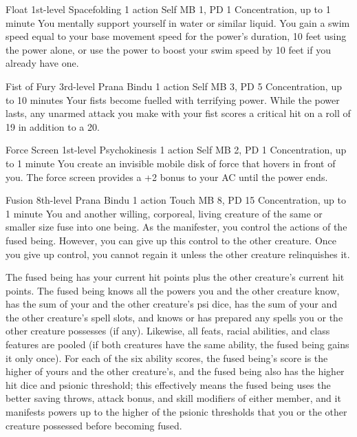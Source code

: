 \DndPowerHeader%
  {Float}
  {1st-level Spacefolding}
  {1 action}
  {Self}
  {MB 1, PD 1}
  {Concentration, up to 1 minute}
You mentally support yourself in water or similar liquid.
You gain a swim speed equal to your base movement speed for
the power's duration, 10 feet using the power alone,
or use the power to boost your swim speed by 10 feet if you already have one.

\DndPowerHeader%
  {Fist of Fury}
  {3rd-level Prana Bindu}
  {1 action}
  {Self}
  {MB 3, PD 5}
  {Concentration, up to 10 minutes}
Your fists become fuelled with terrifying power.
While the power lasts,
any unarmed attack you make with your fist
scores a critical hit on a roll of
19 in addition to a 20.

\DndPowerHeader%
  {Force Screen}
  {1st-level Psychokinesis}
  {1 action}
  {Self}
  {MB 2, PD 1}
  {Concentration, up to 1 minute}
You create an invisible mobile disk of force that hovers in front of you.
The force screen provides a +2 bonus to your AC until the power ends.

\DndPowerHeader%
  {Fusion}
  {8th-level Prana Bindu}
  {1 action}
  {Touch}
  {MB 8, PD 15}
  {Concentration, up to 1 minute}
  You and another willing, corporeal, living creature
  of the same or smaller size fuse into one being.
  As the manifester,
  you control the actions of the fused being.
  However, you can give up this control to the other creature.
  Once you give up control,
  you cannot regain it unless the other creature relinquishes it.

  The fused being has your current hit points
  plus the other creature's current hit points.
  The fused being knows all the powers you
  and the other creature know,
  has the sum of your and the other creature's psi dice,
  has the sum of your and the other creature's spell slots,
  and knows or has prepared any spells you or the other creature possesses
  (if any).
  Likewise, all feats, racial abilities, and class features
  are pooled
  (if both creatures have the same ability,
  the fused being gains it only once).
  For each of the six ability scores,
  the fused being's score is the higher of yours
  and the other creature's,
  and the fused being also has the higher hit dice
  and psionic threshold;
  this effectively means the fused being uses
  the better saving throws,
  attack bonus,
  and skill modifiers of either member,
  and it manifests powers up to the higher of the psionic thresholds
  that you or the other creature possessed before becoming fused.
  
